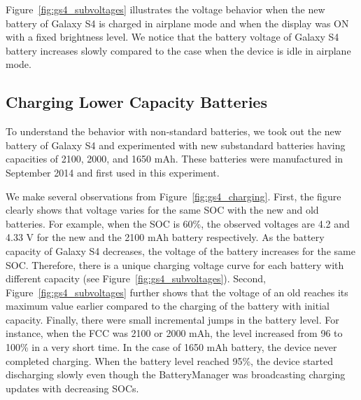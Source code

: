 \documentclass[journal]{IEEEtran}
\begin{document}
 Figure~\ref{fig:gs4_subvoltages} illustrates the voltage behavior when the new battery of Galaxy S4 is charged in airplane mode and when the display was ON with a fixed brightness level. We notice that the battery voltage of Galaxy S4 battery increases slowly compared to the case when the device is idle in airplane mode.


\begin{figure*}[t]
  \begin{center}


\caption{{\bf Battery Voltage and charging current vs SOC while charging via AC.} {\sl Voltage curve of a lower FCC battery deviates from the curve of a new battery. The charging current plots (orange color) follow the legend of the corresponding voltage curves.}}

\label{fig:gs4_charging}
 \end{center}
 \end{figure*}

\subsection{Charging Lower Capacity Batteries}



To understand the behavior with non-standard batteries, we took out the new battery of Galaxy S4 and experimented with new substandard batteries having capacities of 2100, 2000, and 1650 mAh. These batteries were manufactured in September 2014 and first used in this experiment. 





We make several observations from Figure~\ref{fig:gs4_charging}.
First, the figure clearly shows that voltage varies for the same SOC with the new and old batteries. For example, when the SOC is 60\%, the observed voltages are 4.2 and 4.33 V for the new and the 2100 mAh battery respectively. As the battery capacity of Galaxy S4 decreases, the voltage of the battery increases for the same SOC.  Therefore, there is a unique charging voltage curve for each battery with different capacity (see Figure~\ref{fig:gs4_subvoltages}). 
Second, Figure~\ref{fig:gs4_subvoltages} further shows that the voltage of an old reaches its maximum value earlier compared to the charging of the battery with initial capacity.  Finally, there were small incremental jumps in the battery level. For instance, when the FCC was 2100 or 2000 mAh, the level increased from 96 to 100\% in a very short time. In the case of 1650 mAh battery, the device never completed charging. When the battery level reached 95\%, the device started discharging slowly even though the BatteryManager was broadcasting charging updates with decreasing SOCs.
\end{document}
